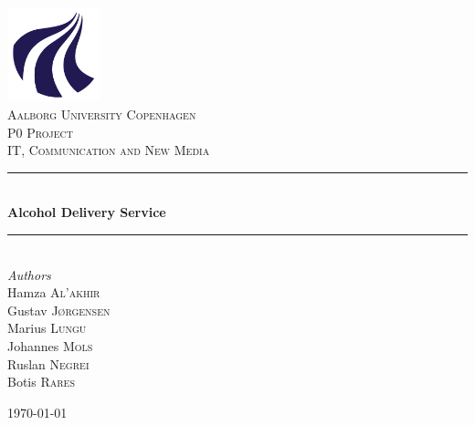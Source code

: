 \documentclass{article}
\begin{document}

\begin{titlepage}
    
    \newcommand{\HRule}{\rule{\linewidth}{0.5mm}} %
    
    \center
    
	
	\includegraphics[width=0.2\textwidth]{pics/AAU_Logo.png}\\[1cm]
    
	
	\textsc{\LARGE Aalborg University Copenhagen}\\[1.5cm]
	
	\textsc{\Large P0 Project}\\[0.5cm]
	
	\textsc{\large IT, Communication and New Media}\\[0.5cm]
	
	
	\HRule\\[0.4cm]
	
	{\huge\bfseries Alcohol Delivery Service}\\[0.4cm]
	
	\HRule\\[1.5cm]
	
	
	{\large\textit{Authors}} \\
	Hamza \textsc{Al'akhir} \\
	Gustav \textsc{Jørgensen} \\
	Marius \textsc{Lungu} \\
	Johannes \textsc{Mols} \\
	Ruslan \textsc{Negrei} \\
	Botis \textsc{Rares} \\
	
	
	\vfill\vfill\vfill %
	
	{\large\today} %
	
    
\end{titlepage}



\end{document}
